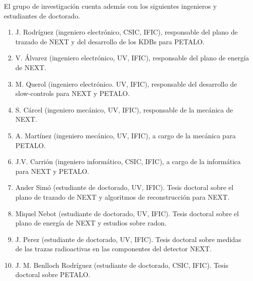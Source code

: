 El grupo de investigación cuenta además con los siguientes ingenieros y estudiantes de doctorado. 
\begin{enumerate}
\item J. Rodríguez (ingeniero electrónico, CSIC, IFIC), responsable del plano de trazado de NEXT y del desarrollo de los KDBs para PETALO. 
\item V. Álvarez (ingeniero electrónico, UV, IFIC), responsable del plano de energía de NEXT.
\item M. Querol (ingeniero electrónico. UV, IFIC), responsable del desarrollo de slow-controls para NEXT y PETALO.
\item S. Cárcel (ingeniero mecánico, UV, IFIC), responsable de la mecánica de NEXT.
\item A. Martínez (ingeniero mecánico, UV, IFIC), a cargo de la mecánica para PETALO. 
\item J.V. Carrión (ingeniero informático, CSIC, IFIC), a cargo de la informática para NEXT y PETALO. 
\item Ander Simó (estudiante de doctorado, UV, IFIC). Tesis doctoral sobre el plano de trazado de NEXT y algoritmos de reconstrucción para NEXT.
\item Miquel Nebot (estudiante de doctorado, UV, IFIC). Tesis doctoral sobre el plano de energía de NEXT y estudios sobre radon.
\item J. Perez (estudiante de doctorado, UV, IFIC). Tesis doctoral sobre medidas de las trazas radioactivas en las componentes del detector NEXT.
\item J. M. Benlloch Rodríguez (estudiante de doctorado, CSIC, IFIC). Tesis doctoral sobre PETALO.  
\end{enumerate}
























